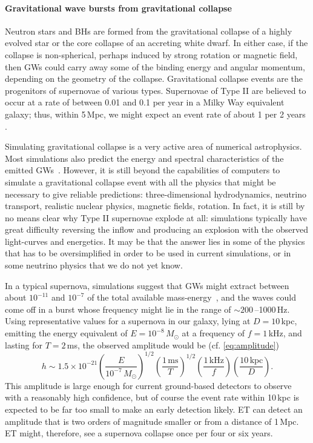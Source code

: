\paragraph{Gravitational wave bursts from gravitational collapse}
Neutron stars and BHs are formed from the gravitational collapse 
of a highly evolved star or the core collapse of an accreting white
dwarf.  In either case, if the collapse is non-spherical, perhaps induced by
strong rotation or magnetic field, then GWs could 
carry away some of the binding energy and angular momentum, depending 
on the geometry of the collapse. 
Gravitational collapse events are the progenitors of supernovae of 
various types.  Supernovae of Type II are believed to occur at a rate of between 
0.01 and 0.1 per year in a Milky Way equivalent galaxy; thus, within 5\,Mpc,
we might expect an event rate of about 1 per 2 years \cite{ando:05}. 

Simulating gravitational collapse is a very active area of numerical 
astrophysics. Most simulations also predict the energy and spectral 
characteristics of the emitted GWs~\cite{ott:09,Living:Fryer}. 
However, it is still beyond the capabilities of computers to simulate a 
gravitational collapse event with all the physics that might be necessary 
to give reliable predictions: three-dimensional hydrodynamics, neutrino 
transport, realistic nuclear physics, magnetic fields, rotation. In fact, 
it is still by no means clear why Type II supernovae explode at all: simulations 
typically have great difficulty reversing the inflow and producing an explosion
with the observed light-curves and energetics. It may be that the answer lies 
in some of the physics that has to be oversimplified in order to be used in 
current simulations, or in some neutrino physics that we do not yet know.

In a typical supernova, simulations suggest that GWs might extract 
between about $10^{-11}$ and $10^{-7}$ of the total available
mass-energy~\cite{dimmelmeier:08,murphy:09,marek:09b,scheidegger:10b}, and the
waves could come off in a burst whose frequency might lie in the range
of $\sim 200$\,--1000\,Hz.
Using representative values for a supernova in our galaxy, lying at $D=10$\,kpc, 
emitting the energy equivalent of $E=10^{-8}\,M_\odot$ at a frequency of $f=1$\,kHz, 
and lasting for $T=2$\,ms, the observed amplitude would be (cf. \ref{eq:amplitude})
%
\begin{equation}
h \sim 1.5 \times 10^{-21}
\left ( \frac{E}{10^{-7}\,M_\odot} \right )^{1/2}
\left ( \frac{1\mathrm{\,ms}}{T} \right )^{1/2}
\left ( \frac{1\mathrm{\,kHz}}{f} \right )
\left ( \frac{10\mathrm{\,kpc}}{D} \right ).
\label {eq:amplitudeB}
\end{equation}
%
This amplitude is large enough for current ground-based detectors to observe with a
reasonably high confidence, but of course the event rate within 10\,kpc is
expected to be far too small to make an early detection likely. ET can
detect an amplitude that is two orders of magnitude smaller or from a distance
of 1\,Mpc. ET might, therefore, see a supernova collapse once per four or six years.

